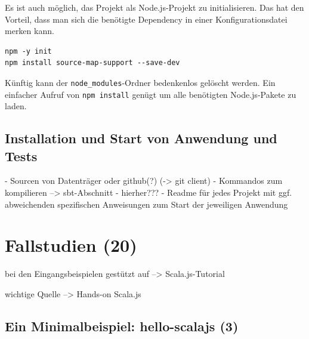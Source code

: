\documentclass[a4paper, 12pt, listof=totoc, bibliography=totoc]{scrreprt}
\begin{document}
Es ist auch möglich, das Projekt als Node.js-Projekt zu initialisieren. Das hat den Vorteil, dass man sich die benötigte Dependency in einer Konfigurationsdatei merken kann.

\begin{lstlisting}
npm -y init
npm install source-map-support --save-dev
\end{lstlisting}

Künftig kann der \texttt{node\_modules}-Ordner bedenkenlos gelöscht werden. Ein einfacher Aufruf von \texttt{npm install} genügt um alle benötigten Node.js-Pakete zu laden.


\section{Installation und Start von Anwendung und Tests}

- Sourcen von Datenträger oder github(?) (-> git client)
- Kommandos zum kompilieren --> sbt-Abschnitt - hierher???
- Readme für jedes Projekt mit ggf. abweichenden spezifischen Anweisungen zum Start der jeweiligen Anwendung


\chapter{Fallstudien (20)}

bei den Eingangsbeispielen gestützt auf
-->  Scala.js-Tutorial

wichtige Quelle
-->  Hands-on Scala.js


\section{Ein Minimalbeispiel: hello-scalajs (3)}


%
%
%
%
\end{document}
